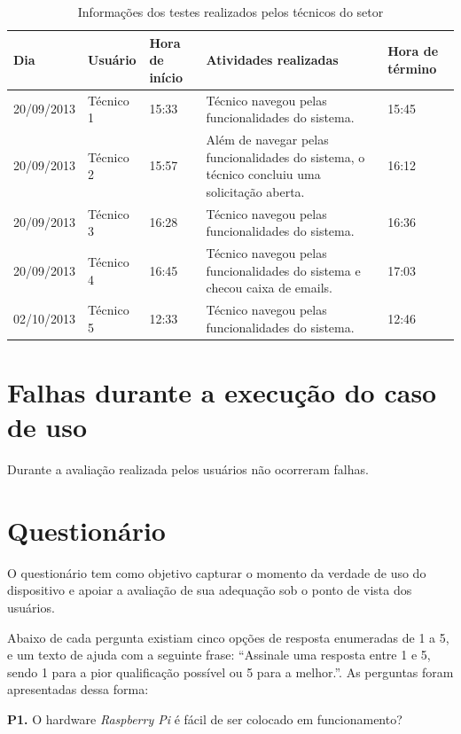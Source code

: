 \begin{table}[!htpb]
 \centering
    \begin{tabular}{|p{2cm}|p{2cm}|p{2cm}|p{5cm}|p{2cm}|} 
    \hline
        \textbf{Dia} & \textbf{Usuário} & \textbf{Hora de início} & \textbf{Atividades realizadas} &  \textbf{Hora de término} \\
    \hline
         20/09/2013 & Técnico 1 & 15:33 & Técnico navegou pelas funcionalidades do sistema. & 15:45 \\
    \hline
        20/09/2013 & Técnico 2 & 15:57 & Além de navegar pelas funcionalidades do sistema, o técnico concluiu uma solicitação aberta. & 16:12 \\
    \hline
        20/09/2013 & Técnico 3 & 16:28 & Técnico navegou pelas funcionalidades do sistema. & 16:36 \\
    \hline
        20/09/2013 & Técnico 4 & 16:45 & Técnico navegou pelas funcionalidades do sistema e checou caixa de emails. & 17:03 \\
    \hline
        02/10/2013 & Técnico 5 & 12:33 & Técnico navegou pelas funcionalidades do sistema. & 12:46 \\
    \hline
    \end{tabular}
    \caption{Informações dos testes realizados pelos técnicos do setor}
    \label{t_fixa}
\end{table}

\section{Falhas durante a execução do caso de uso}

Durante a avaliação realizada pelos usuários não ocorreram falhas.

\section{Questionário}

O questionário tem como objetivo capturar o momento da verdade de uso do dispositivo e apoiar a avaliação de sua adequação sob o ponto de vista dos usuários.

Abaixo de cada pergunta existiam cinco opções de resposta enumeradas de 1 a 5, e um texto de ajuda com a seguinte frase: “Assinale uma resposta entre 1 e 5, sendo 1 para a pior qualificação possível ou 5 para a melhor.”.
As perguntas foram apresentadas dessa forma:

\textbf{P1.} O hardware \textit{Raspberry Pi} é fácil de ser colocado em funcionamento?

